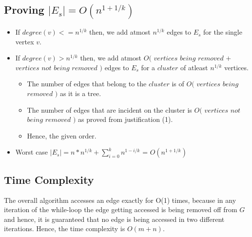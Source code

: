 \documentclass{article}
\begin{document}
\subsection{Proving $|E_s| = O(n^{1+1/k}) $}
\begin{itemize}
\item If $degree(v) <= n^{1/k}$ then, we add atmost $n^{1/k}$ edges to $E_s$ for the single vertex $v$.
\item If $degree(v) > n^{1/k}$ then, we add atmost $O($ $vertices$ $being$ $removed$ $ + $ $vertices$ $not$ $being$ $removed$ $)$ edges to $E_s$ for a $cluster$ of atleast $n^{1/k}$ vertices.
\begin{itemize}
\item The number of edges that belong to the $cluster$ is of $O($ $vertices$ $being$ $removed$ $)$ as it is a tree.
\item The number of edges that are incident on the cluster is $O($ $vertices$ $not$ $being$ $removed$ $)$ as proved from justification (1). 
\item Hence, the given order.
\end{itemize}
\item Worst case $|E_s|  =  n*n^{1/k} + \sum_{i=0}^{k} n^{1-i/k}$ = $O(n^{1+1/k})$ 
\end{itemize}
\subsection{Time Complexity}
The overall algorithm accesses an edge exactly for O(1) times, because in any iteration of the while-loop the edge getting accessed is being removed off from $G$ and hence, it is guaranteed that no edge is being accessed in two different iterations. Hence, the time complexity is $O(m+n)$.    
\end{document}

